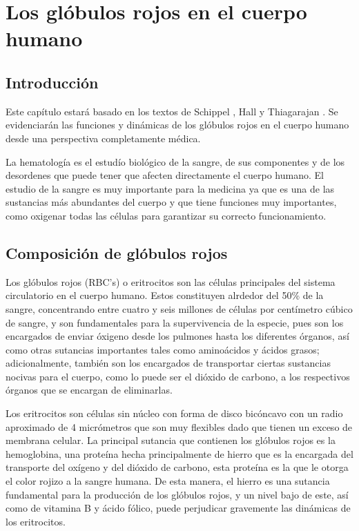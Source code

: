\chapter{Los glóbulos rojos en el cuerpo humano}\label{chap:RBC}
\section{Introducción}\label{sec:RBC:intro}
Este capítulo estará basado en los textos de Schippel \cite{schippel2023dynamics}, Hall \cite{hall2021guyton} y Thiagarajan \cite{thiagarajan2021red}. Se evidenciarán las funciones y dinámicas de los glóbulos rojos en el cuerpo humano desde una perspectiva completamente médica.

La hematología es el estudío biológico de la sangre, de sus componentes y de los desordenes que puede tener que afecten directamente el cuerpo humano. El estudio de la sangre es muy importante para la medicina ya que es una de las sustancias más abundantes del cuerpo y que tiene funciones muy importantes, como oxigenar todas las células para garantizar su correcto funcionamiento.

\section{Composición de glóbulos rojos}\label{sec:RBC:Composicion}
Los glóbulos rojos (RBC's) o eritrocitos son las células principales del sistema circulatorio en el cuerpo humano. Estos constituyen alrdedor del 50\% de la sangre, concentrando entre cuatro y seis millones de células por centímetro cúbico de sangre, y son fundamentales para la supervivencia de la especie, pues son los encargados de enviar óxigeno desde los pulmones hasta los diferentes órganos, así como otras sutancias importantes tales como aminoácidos y ácidos grasos; adicionalmente, también son los encargados de transportar ciertas sustancias nocivas para el cuerpo, como lo puede ser el dióxido de carbono, a los respectivos órganos que se encargan de eliminarlas.

Los eritrocitos son células sin núcleo con forma de disco bicóncavo con un radio aproximado de 4 micrómetros que son muy flexibles dado que tienen un exceso de membrana celular. La principal sutancia que contienen los glóbulos rojos es la hemoglobina, una proteína hecha principalmente de hierro que es la encargada del transporte del oxígeno y del dióxido de carbono, esta proteína es la que le otorga el color rojizo a la sangre humana. De esta manera, el hierro es una sutancia fundamental para la producción de los glóbulos rojos, y un nivel bajo de este, así como de vitamina B y ácido fólico, puede perjudicar gravemente las dinámicas de los eritrocitos.

